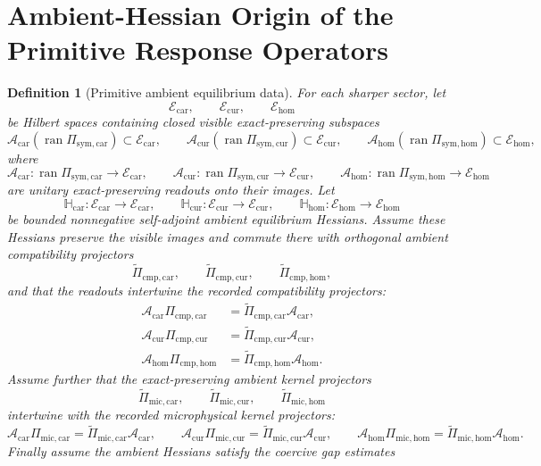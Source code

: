 \documentclass[11pt]{article}
\newcommand{\UltraCarProj}{\Pi_{\mathrm{mic,car}}}
\newcommand{\UltraCurProj}{\Pi_{\mathrm{mic,cur}}}
\newcommand{\UltraHomProj}{\Pi_{\mathrm{mic,hom}}}
\newcommand{\TensorSymProj}{\Pi_{\mathrm{sym,car}}}
\newcommand{\CurSymProj}{\Pi_{\mathrm{sym,cur}}}
\newcommand{\HomSymProj}{\Pi_{\mathrm{sym,hom}}}
\newcommand{\TensorCmpProj}{\Pi_{\mathrm{cmp,car}}}
\newcommand{\CurCmpProj}{\Pi_{\mathrm{cmp,cur}}}
\newcommand{\HomCmpProj}{\Pi_{\mathrm{cmp,hom}}}
\newcommand{\TensorEqClass}{\mathscr E_{\mathrm{car}}}
\newcommand{\CurEqClass}{\mathscr E_{\mathrm{cur}}}
\newcommand{\HomEqClass}{\mathscr E_{\mathrm{hom}}}
\newcommand{\TensorEqRead}{\mathcal A_{\mathrm{car}}}
\newcommand{\CurEqRead}{\mathcal A_{\mathrm{cur}}}
\newcommand{\HomEqRead}{\mathcal A_{\mathrm{hom}}}
\newcommand{\TensorAmbientHess}{\mathbb H_{\mathrm{car}}}
\newcommand{\CurAmbientHess}{\mathbb H_{\mathrm{cur}}}
\newcommand{\HomAmbientHess}{\mathbb H_{\mathrm{hom}}}
\newcommand{\TensorEqCmpProj}{\widetilde\Pi_{\mathrm{cmp,car}}}
\newcommand{\CurEqCmpProj}{\widetilde\Pi_{\mathrm{cmp,cur}}}
\newcommand{\HomEqCmpProj}{\widetilde\Pi_{\mathrm{cmp,hom}}}
\newcommand{\TensorEqKerProj}{\widetilde\Pi_{\mathrm{mic,car}}}
\newcommand{\CurEqKerProj}{\widetilde\Pi_{\mathrm{mic,cur}}}
\newcommand{\HomEqKerProj}{\widetilde\Pi_{\mathrm{mic,hom}}}
\newtheorem{definition}{Definition}
\begin{document}
\section{Ambient-Hessian Origin of the Primitive Response Operators}

\begin{definition}[Primitive ambient equilibrium data]
\label{def:ambient_hessian}
For each sharper sector, let
\[
\TensorEqClass,\qquad
\CurEqClass,\qquad
\HomEqClass
\]
be Hilbert spaces containing closed visible exact-preserving subspaces
\[
\TensorEqRead(\operatorname{ran}\TensorSymProj)\subset\TensorEqClass,\qquad
\CurEqRead(\operatorname{ran}\CurSymProj)\subset\CurEqClass,\qquad
\HomEqRead(\operatorname{ran}\HomSymProj)\subset\HomEqClass,
\]
where
\[
\TensorEqRead:\operatorname{ran}\TensorSymProj\to\TensorEqClass,\qquad
\CurEqRead:\operatorname{ran}\CurSymProj\to\CurEqClass,\qquad
\HomEqRead:\operatorname{ran}\HomSymProj\to\HomEqClass
\]
are unitary exact-preserving readouts onto their images. Let
\[
\TensorAmbientHess:\TensorEqClass\to\TensorEqClass,\qquad
\CurAmbientHess:\CurEqClass\to\CurEqClass,\qquad
\HomAmbientHess:\HomEqClass\to\HomEqClass
\]
be bounded nonnegative self-adjoint ambient equilibrium Hessians. Assume these Hessians preserve the visible images and commute there with orthogonal ambient compatibility projectors
\[
\TensorEqCmpProj,\qquad
\CurEqCmpProj,\qquad
\HomEqCmpProj,
\]
and that the readouts intertwine the recorded compatibility projectors:
\begin{equation}
\begin{aligned}
\TensorEqRead\TensorCmpProj&=\TensorEqCmpProj\TensorEqRead,
\\
\CurEqRead\CurCmpProj&=\CurEqCmpProj\CurEqRead,
\\
\HomEqRead\HomCmpProj&=\HomEqCmpProj\HomEqRead.
\end{aligned}
\label{eq:cmp_intertwine}
\end{equation}
Assume further that the exact-preserving ambient kernel projectors
\[
\TensorEqKerProj,\qquad
\CurEqKerProj,\qquad
\HomEqKerProj
\]
intertwine with the recorded microphysical kernel projectors:
\begin{equation}
\TensorEqRead\UltraCarProj=\TensorEqKerProj\TensorEqRead,
\qquad
\CurEqRead\UltraCurProj=\CurEqKerProj\CurEqRead,
\qquad
\HomEqRead\UltraHomProj=\HomEqKerProj\HomEqRead.
\label{eq:kernel_intertwine}
\end{equation}
Finally assume the ambient Hessians satisfy the coercive gap estimates
\begin{equation}

\end{equation}
\end{definition}
\end{document}
